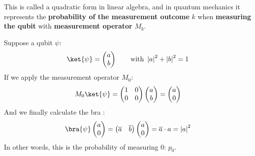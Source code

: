 \begin{remarkbox}
  This is called a quadratic form in linear algebra, and in quantum mechanics it represents the \textbf{probability of the measurement outcome} $k$ when \textbf{measuring the qubit} \ket{\psi} with \textbf{measurement operator} $M_{k}$.

  Suppose a qubit $\psi$:
  \begin{equation*}
    \ket{\psi} = \begin{pmatrix}
      a \\
      b
    \end{pmatrix}
    \hspace{2em}
    \text{with } \left|a\right|^{2} + \left|b\right|^{2} = 1
  \end{equation*}
  If we apply the measurement operator $M_{0}$:
  \begin{equation*}
    M_{0} \ket{\psi} =
    \begin{pmatrix}
      1 & 0 \\ 0 & 0
    \end{pmatrix}
    \begin{pmatrix}
      a \\ b
    \end{pmatrix}
    =
    \begin{pmatrix}
      a \\ 0
    \end{pmatrix}
  \end{equation*}
  And we finally calculate the bra \bra{\psi}:
  \begin{equation*}
    \bra{\psi} \begin{pmatrix}
      a \\ 0
    \end{pmatrix}
    =
    \begin{pmatrix}
      \overline{a} & \overline{b}
    \end{pmatrix}
    \begin{pmatrix}
      a \\ 0
    \end{pmatrix}
    = \overline{a} \cdot a = \left|a\right|^{2}
  \end{equation*}
  In other words, this is the probability of measuring 0: $p_{0}$.
\end{remarkbox}

